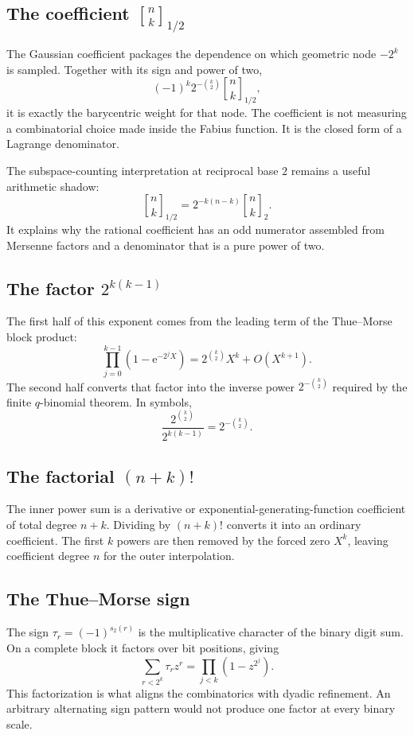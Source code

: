 \documentclass[11pt,oneside]{article}
\theoremstyle{definition}
\theoremstyle{remark}
\newcommand{\qbinom}[3]{{\genfrac{[}{]}{0pt}{}{#1}{#2}}_{#3}}
\newcommand{\halfqbinom}[2]{{\genfrac{[}{]}{0pt}{}{#1}{#2}}_{1/2}}
\newcommand{\e}{\mathrm e}
\newcommand{\tm}{\tau}
\begin{document}
\subsection{The coefficient \texorpdfstring{$\halfqbinom{n}{k}$}{[n choose k] at q=1/2}}

The Gaussian coefficient packages the dependence on which geometric node
$-2^k$ is sampled.  Together with its sign and power of two,
\[
 (-1)^k2^{-\binom{k}{2}}\halfqbinom{n}{k},
\]
it is exactly the barycentric weight for that node.  The coefficient is not
measuring a combinatorial choice made inside the Fabius function.  It is the
closed form of a Lagrange denominator.

The subspace-counting interpretation at reciprocal base $2$ remains a useful
arithmetic shadow:
\[
 \halfqbinom{n}{k}=2^{-k(n-k)}\qbinom{n}{k}{2}.
\]
It explains why the rational coefficient has an odd numerator assembled
from Mersenne factors and a denominator that is a pure power of two.

\subsection{The factor \texorpdfstring{$2^{k(k-1)}$}{2 to the k(k-1)}}

The first half of this exponent comes from the leading term of the
Thue--Morse block product:
\[
 \prod_{j=0}^{k-1}(1-\e^{-2^jX})
 =2^{\binom{k}{2}}X^k+O(X^{k+1}).
\]
The second half converts that factor into the inverse power
$2^{-\binom{k}{2}}$ required by the finite $q$-binomial theorem.  In symbols,
\[
 \frac{2^{\binom{k}{2}}}{2^{k(k-1)}}
 =2^{-\binom{k}{2}}.
\]

\subsection{The factorial \texorpdfstring{$(n+k)!$}{(n+k)!}}

The inner power sum is a derivative or exponential-generating-function
coefficient of total degree $n+k$.  Dividing by $(n+k)!$ converts it into an
ordinary coefficient.  The first $k$ powers are then removed by the forced
zero $X^k$, leaving coefficient degree $n$ for the outer interpolation.

\subsection{The Thue--Morse sign}

The sign $\tm_r=(-1)^{s_2(r)}$ is the multiplicative character of the binary
digit sum.  On a complete block it factors over bit positions, giving
\[
 \sum_{r<2^k}\tm_rz^r=\prod_{j<k}(1-z^{2^j}).
\]
This factorization is what aligns the combinatorics with dyadic refinement.
An arbitrary alternating sign pattern would not produce one factor at every
binary scale.
\end{document}

